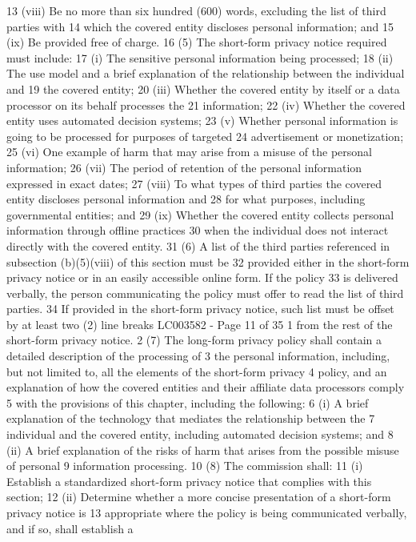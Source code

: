 13 (viii) Be no more than six hundred (600) words, excluding the list of third parties with
14 which the covered entity discloses personal information; and
15 (ix) Be provided free of charge.
16 (5) The short-form privacy notice required must include:
17 (i) The sensitive personal information being processed;
18 (ii) The use model and a brief explanation of the relationship between the individual and
19 the covered entity;
20 (iii) Whether the covered entity by itself or a data processor on its behalf processes the
21 information;
22 (iv) Whether the covered entity uses automated decision systems;
23 (v) Whether personal information is going to be processed for purposes of targeted
24 advertisement or monetization;
25 (vi) One example of harm that may arise from a misuse of the personal information;
26 (vii) The period of retention of the personal information expressed in exact dates;
27 (viii) To what types of third parties the covered entity discloses personal information and
28 for what purposes, including governmental entities; and
29 (ix) Whether the covered entity collects personal information through offline practices
30 when the individual does not interact directly with the covered entity.
31 (6) A list of the third parties referenced in subsection (b)(5)(viii) of this section must be
32 provided either in the short-form privacy notice or in an easily accessible online form. If the policy
33 is delivered verbally, the person communicating the policy must offer to read the list of third parties.
34 If provided in the short-form privacy notice, such list must be offset by at least two (2) line breaks 
LC003582 - Page 11 of 35
1 from the rest of the short-form privacy notice.
2 (7) The long-form privacy policy shall contain a detailed description of the processing of
3 the personal information, including, but not limited to, all the elements of the short-form privacy
4 policy, and an explanation of how the covered entities and their affiliate data processors comply
5 with the provisions of this chapter, including the following:
6 (i) A brief explanation of the technology that mediates the relationship between the
7 individual and the covered entity, including automated decision systems; and
8 (ii) A brief explanation of the risks of harm that arises from the possible misuse of personal
9 information processing.
10 (8) The commission shall:
11 (i) Establish a standardized short-form privacy notice that complies with this section;
12 (ii) Determine whether a more concise presentation of a short-form privacy notice is
13 appropriate where the policy is being communicated verbally, and if so, shall establish a
